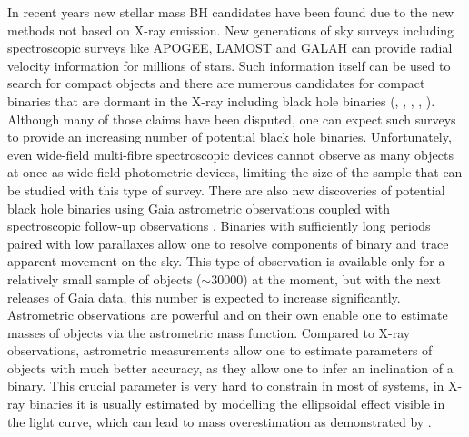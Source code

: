 \documentclass{pracalicmgr}
\begin{document}
In recent years new stellar mass BH candidates have been found due to the new methods not based on X-ray emission. New generations of sky surveys
including spectroscopic surveys like APOGEE, LAMOST and GALAH can provide radial velocity information for millions of stars. Such
information itself can be used to search for compact objects and there are numerous candidates for compact binaries that are dormant in the
X-ray including black hole binaries (\citet{liu_wide_2019}, \citet{jayasinghe_asas-sn_2019}, \citet{shenar_x-ray-quiet_2022}, \citet{lennon_vlt-flames_2022},
\citet{thompson_noninteracting_2019}).
Although many of those claims have been disputed,
one can expect such surveys to provide an increasing number of potential black hole binaries. Unfortunately, even wide-field multi-fibre spectroscopic
devices cannot observe as many objects at once as wide-field photometric devices, limiting the size of the sample that can be studied with this type of
survey. There are also new discoveries of potential black hole binaries using Gaia astrometric observations coupled with spectroscopic follow-up 
observations \citep{el-badry_sun-like_2022,el-badry_red_2023}.
Binaries with sufficiently long periods
paired with low parallaxes allow one to resolve components of binary and trace apparent movement on the sky.
This type of observation is available only for a relatively small sample of objects ($\sim 30000$) at the moment,
but with the next releases of Gaia data, this number is expected to increase significantly. Astrometric observations
are powerful and on their own enable one to estimate masses of objects via the astrometric mass function.
Compared to X-ray observations, astrometric measurements allow one to estimate parameters of objects with much better accuracy, as they allow one to infer an inclination of a binary. 
This crucial parameter is very hard to constrain in most of systems, in X-ray binaries it is usually estimated by modelling the ellipsoidal effect visible in the light curve,
which can lead to mass overestimation as demonstrated by \citep{kreidberg_mass_2012}. 
\end{document}
